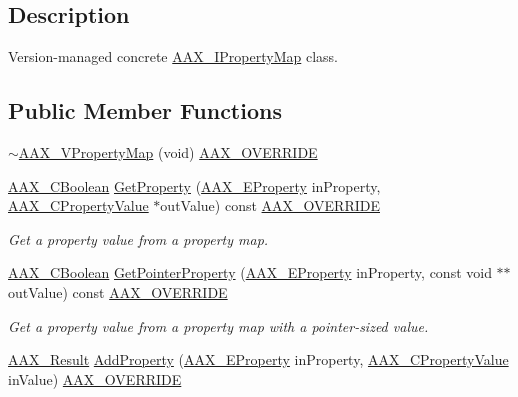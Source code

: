 \subsection{Description}
Version-\/managed concrete \mbox{\hyperlink{a01869}{A\+A\+X\+\_\+\+I\+Property\+Map}} class. \subsection*{Public Member Functions}
\begin{DoxyCompactItemize}
\item 
\mbox{\hyperlink{a01937_a7f41763fef1dffacb2c1cf926f9a1ec3}{$\sim$\+A\+A\+X\+\_\+\+V\+Property\+Map}} (void) \mbox{\hyperlink{a00392_ac2f24a5172689ae684344abdcce55463}{A\+A\+X\+\_\+\+O\+V\+E\+R\+R\+I\+DE}}
\item 
\mbox{\hyperlink{a00392_aa216506530f1d19a2965931ced2b274b}{A\+A\+X\+\_\+\+C\+Boolean}} \mbox{\hyperlink{a01937_aea41159600be7a16571fc03a2c20f22d}{Get\+Property}} (\mbox{\hyperlink{a00662_a13e384f22825afd3db6d68395b79ce0d}{A\+A\+X\+\_\+\+E\+Property}} in\+Property, \mbox{\hyperlink{a00392_ab247c0d8686c14e05cbb567ef276f249}{A\+A\+X\+\_\+\+C\+Property\+Value}} $\ast$out\+Value) const \mbox{\hyperlink{a00392_ac2f24a5172689ae684344abdcce55463}{A\+A\+X\+\_\+\+O\+V\+E\+R\+R\+I\+DE}}
\begin{DoxyCompactList}\small\item\em Get a property value from a property map. \end{DoxyCompactList}\item 
\mbox{\hyperlink{a00392_aa216506530f1d19a2965931ced2b274b}{A\+A\+X\+\_\+\+C\+Boolean}} \mbox{\hyperlink{a01937_a7bb68a543f1c74b84acf71463bf51450}{Get\+Pointer\+Property}} (\mbox{\hyperlink{a00662_a13e384f22825afd3db6d68395b79ce0d}{A\+A\+X\+\_\+\+E\+Property}} in\+Property, const void $\ast$$\ast$out\+Value) const \mbox{\hyperlink{a00392_ac2f24a5172689ae684344abdcce55463}{A\+A\+X\+\_\+\+O\+V\+E\+R\+R\+I\+DE}}
\begin{DoxyCompactList}\small\item\em Get a property value from a property map with a pointer-\/sized value. \end{DoxyCompactList}\item 
\mbox{\hyperlink{a00392_a4d8f69a697df7f70c3a8e9b8ee130d2f}{A\+A\+X\+\_\+\+Result}} \mbox{\hyperlink{a01937_a33f4492247d093f876a150468c8cdc6d}{Add\+Property}} (\mbox{\hyperlink{a00662_a13e384f22825afd3db6d68395b79ce0d}{A\+A\+X\+\_\+\+E\+Property}} in\+Property, \mbox{\hyperlink{a00392_ab247c0d8686c14e05cbb567ef276f249}{A\+A\+X\+\_\+\+C\+Property\+Value}} in\+Value) \mbox{\hyperlink{a00392_ac2f24a5172689ae684344abdcce55463}{A\+A\+X\+\_\+\+O\+V\+E\+R\+R\+I\+DE}}
$$
\end{DoxyCompactItemize}
